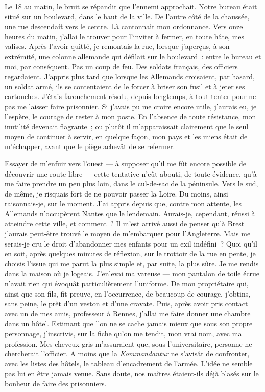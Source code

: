 \documentclass[french,twoside]{book} %
\begin{document}
Le 18 au matin, le bruit se répandit que l’ennemi approchait. Notre bureau était situé sur un boulevard, dans le haut de la ville. De l’autre côté de la chaussée, une rue descendait vers le centre. Là cantonnait mon ordonnance. Vers onze heures du matin, j’allai le trouver pour l’inviter à fermer, en toute hâte, mes valises. Après l’avoir quitté, je remontais la rue, lorsque j’aperçus, à son extrémité, une colonne allemande qui défilait sur le boulevard : entre le bureau et moi, par conséquent. Pas un coup de feu. Des soldats français, des officiers regardaient. J’appris plus tard que lorsque les Allemands croisaient, par hasard, un soldat armé, ils se contentaient de le forcer à briser son fusil et à jeter ses cartouches. J’étais farouchement résolu, depuis longtemps, à tout tenter pour ne pas me laisser faire prisonnier. Si j’avais pu me croire encore utile, j’aurais eu, je l’espère, le courage de rester à mon poste. En l’absence de toute résistance, mon inutilité devenait flagrante ; ou plutôt il m’apparaissait clairement que le seul moyen de continuer à servir, en quelque façon, mon pays et les miens était de m’échapper, avant que le piège achevât de se refermer.\par
Essayer de m’enfuir vers l’ouest — à supposer qu’il me fût encore possible de découvrir une route libre — cette tentative n’eût abouti, de toute évidence, qu’à me faire prendre un peu plus loin, dans le cul-de-sac de la péninsule. Vers le sud, de même, je risquais fort de ne pouvoir passer la Loire. Du moins, ainsi raisonnais-je, sur le moment. J’ai appris depuis que, contre mon attente, les Allemands n’occupèrent Nantes que le lendemain. Aurais-je,   cependant, réussi à atteindre cette ville, et comment ? Il m’est arrivé aussi de penser qu’à Brest j’aurais peut-être trouvé le moyen de m’embarquer pour l’Angleterre. Mais me serais-je cru le droit d’abandonner mes enfants pour un exil indéfini ? Quoi qu’il en soit, après quelques minutes de réflexion, sur le trottoir de la rue en pente, je choisis l’issue qui me parut la plus simple et, par suite, la plus sûre. Je me rendis dans la maison où je logeais. J’enlevai ma vareuse — mon pantalon de toile écrue n’avait rien qui évoquât particulièrement l’uniforme. De mon propriétaire qui, ainsi que son fils, fit preuve, en l’occurrence, de beaucoup de courage, j’obtins, sans peine, le prêt d’un veston et d’une cravate. Puis, après avoir pris contact avec un de mes amis, professeur à Rennes, j’allai me faire donner une chambre dans un hôtel. Estimant que l’on ne se cache jamais mieux que sous son propre personnage, j’inscrivis, sur la fiche qu’on me tendit, mon vrai nom, avec ma profession. Mes cheveux gris m’assuraient que, sous l’universitaire, personne ne chercherait l’officier. A moins que la {\itshape Kommandantur} ne s’avisât de confronter, avec les listes des hôtels, le tableau d’encadrement de l’armée. L’idée ne semble pas lui en être jamais venue. Sans doute, nos maîtres étaient-ils déjà blasés sur le bonheur de faire des prisonniers.\par
\end{document}

